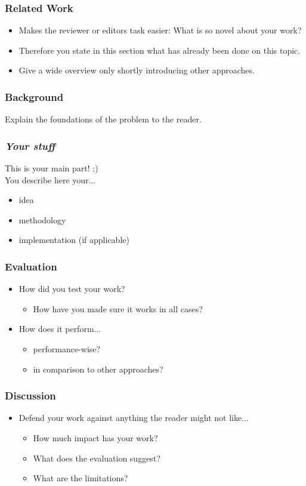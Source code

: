 \documentclass[xcolor={usenames,dvipsnames}]{beamer}
\begin{document}
\begin{frame}
	\frametitle{Related Work}

	\begin{itemize}
		\item Makes the reviewer or editors task easier: What is so novel about your work?
		\item Therefore you state in this section what has already been done on this topic.
		\item Give a wide overview only shortly introducing other approaches.
	\end{itemize}
\end{frame}

\begin{frame}
	\frametitle{Background}

	Explain the foundations of the problem to the reader.
\end{frame}

\begin{frame}
	\frametitle{\emph{Your stuff}}
	
	This is your main part! ;)\\[2em]
	You describe here your...
	\begin{itemize}
		\item idea
		\item methodology
		\item implementation (if applicable)
	\end{itemize}
\end{frame}

\begin{frame}
	\frametitle{Evaluation}

	\begin{itemize}
		\item How did you \alert{test} your work?
			\begin{itemize}
				\item How have you made sure it works in all cases?
			\end{itemize}
		\item How does it perform...
			\begin{itemize}
				\item performance-wise?
				\item in comparison to other approaches?
			\end{itemize}
	\end{itemize}
\end{frame}

\begin{frame}
	\frametitle{Discussion}

	\begin{itemize}
		\item Defend your work against anything the reader might not like...
			\begin{itemize}
				\item How much impact has your work?
				\item What does the evaluation suggest?
				\item What are the limitations?
			\end{itemize}
	\end{itemize}
\end{frame}
\end{document}
